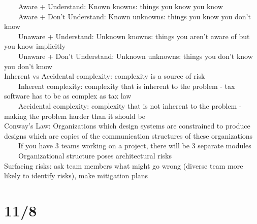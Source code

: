 \documentclass[10pt,letterpaper,unboxed,cm]{article}
\newcommand{\tab}{~~~~}
\begin{document}
\tab Aware + Understand: Known knowns: things you know you know\\
\tab Aware + Don't Understand: Known unknowns: things you know you don't know\\
\tab Unaware + Understand: Unknown knowns: things you aren't aware of but you know implicitly\\
\tab Unaware + Don't Understand: Unknown unknowns: things you don't know you don't know\\
Inherent vs Accidental complexity: complexity is a source of risk\\
\tab Inherent complexity: complexity that is inherent to the problem - tax software has to be as complex as tax law\\
\tab Accidental complexity: complexity that is not inherent to the problem - making the problem harder than it should be\\
Conway's Law: Organizations which design systems are constrained to produce designs which are copies of the communication structures of these organizations\\
\tab If you have 3 teams working on a project, there will be 3 separate modules\\
\tab Organizational structure poses architectural risks\\
Surfacing risks: ask team members what might go wrong (diverse team more likely to identify risks), make mitigation plans
\section{11/8}
\end{document}
